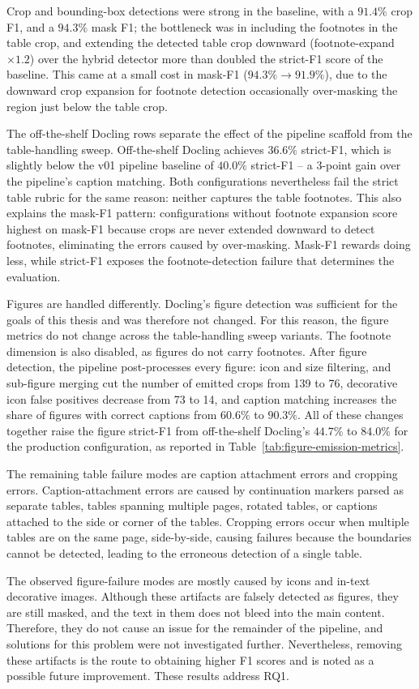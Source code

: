 Crop and bounding-box detections were strong in the baseline, with a $91.4\%$ crop F1, and a $94.3\%$ mask F1; the bottleneck was in including the footnotes in the table crop, and extending the detected table crop downward (footnote-expand $\times1.2$) over the hybrid detector more than doubled the strict-F1 score of the baseline. This came at a small cost in mask-F1 ($94.3\% \rightarrow 91.9\%$), due to the downward crop expansion for footnote detection occasionally over-masking the region just below the table crop. 

The off-the-shelf Docling rows separate the effect of the pipeline scaffold from the table-handling sweep. Off-the-shelf Docling achieves $36.6\%$ strict-F1, which is slightly below the v01 pipeline baseline of $40.0\%$ strict-F1 -- a 3-point gain over the pipeline's caption matching. Both configurations nevertheless fail the strict table rubric for the same reason: neither captures the table footnotes. This also explains the mask-F1 pattern: configurations without footnote expansion score highest on mask-F1 because crops are never extended downward to detect footnotes, eliminating the errors caused by over-masking. Mask-F1 rewards doing less, while strict-F1 exposes the footnote-detection failure that determines the evaluation.

Figures are handled differently. Docling's figure detection was sufficient for the goals of this thesis and was therefore not changed. For this reason, the figure metrics do not change across the table-handling sweep variants. The footnote dimension is also disabled, as figures do not carry footnotes. After figure detection, the pipeline post-processes every figure: icon and size filtering, and sub-figure merging cut the number of emitted crops from 139 to 76, decorative icon false positives decrease from 73 to 14, and caption matching increases the share of figures with correct captions from $60.6\%$ to $90.3\%$. All of these changes together raise the figure strict-F1 from off-the-shelf Docling's $44.7\%$ to $84.0\%$ for the production configuration, as reported in Table~\ref{tab:figure-emission-metrics}.

The remaining table failure modes are caption attachment errors and cropping errors. Caption-attachment errors are caused by continuation markers parsed as separate tables, tables spanning multiple pages, rotated tables, or captions attached to the side or corner of the tables. Cropping errors occur when multiple tables are on the same page, side-by-side, causing failures because the boundaries cannot be detected, leading to the erroneous detection of a single table. 

The observed figure-failure modes are mostly caused by icons and in-text decorative images. Although these artifacts are falsely detected as figures, they are still masked, and the text in them does not bleed into the main content. Therefore, they do not cause an issue for the remainder of the pipeline, and solutions for this problem were not investigated further. Nevertheless, removing these artifacts is the route to obtaining higher F1 scores and is noted as a possible future improvement. These results address RQ1.